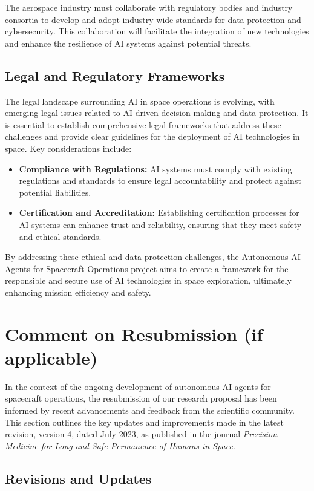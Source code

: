 \documentclass[a4paper, 11pt]{article}
\begin{document}
The aerospace industry must collaborate with regulatory bodies and industry consortia to develop and adopt industry-wide standards for data protection and cybersecurity. This collaboration will facilitate the integration of new technologies and enhance the resilience of AI systems against potential threats.

\subsection{Legal and Regulatory Frameworks}

The legal landscape surrounding AI in space operations is evolving, with emerging legal issues related to AI-driven decision-making and data protection. It is essential to establish comprehensive legal frameworks that address these challenges and provide clear guidelines for the deployment of AI technologies in space. Key considerations include:

\begin{itemize}
    \item \textbf{Compliance with Regulations:} AI systems must comply with existing regulations and standards to ensure legal accountability and protect against potential liabilities.
    \item \textbf{Certification and Accreditation:} Establishing certification processes for AI systems can enhance trust and reliability, ensuring that they meet safety and ethical standards.
\end{itemize}

By addressing these ethical and data protection challenges, the Autonomous AI Agents for Spacecraft Operations project aims to create a framework for the responsible and secure use of AI technologies in space exploration, ultimately enhancing mission efficiency and safety.
\section{Comment on Resubmission (if applicable)}

In the context of the ongoing development of autonomous AI agents for spacecraft operations, the resubmission of our research proposal has been informed by recent advancements and feedback from the scientific community. This section outlines the key updates and improvements made in the latest revision, version 4, dated July 2023, as published in the journal \textit{Precision Medicine for Long and Safe Permanence of Humans in Space}.

\subsection{Revisions and Updates}
\end{document}
